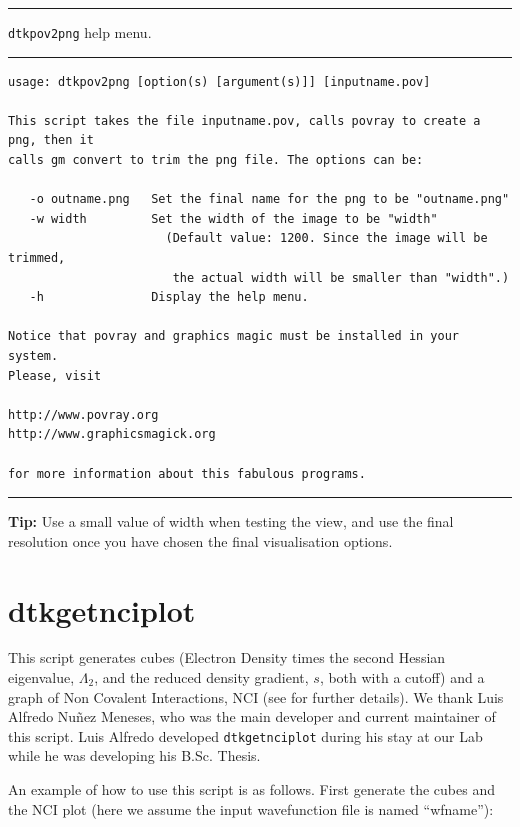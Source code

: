 \rule{\textwidth}{1pt}
{\center\texttt{dtkpov2png} help menu.\\}
\rule{\textwidth}{1pt}
\begin{footnotesize}
\begin{verbatim}
usage: dtkpov2png [option(s) [argument(s)]] [inputname.pov]

This script takes the file inputname.pov, calls povray to create a png, then it
calls gm convert to trim the png file. The options can be:

   -o outname.png   Set the final name for the png to be "outname.png"
   -w width         Set the width of the image to be "width"
                      (Default value: 1200. Since the image will be trimmed, 
                       the actual width will be smaller than "width".)
   -h               Display the help menu.

Notice that povray and graphics magic must be installed in your system.
Please, visit

http://www.povray.org
http://www.graphicsmagick.org

for more information about this fabulous programs.
\end{verbatim}
\end{footnotesize}
\rule{\textwidth}{1pt}

\textbf{Tip:} Use a small value of width when testing the view, and use the final resolution once you have chosen the final visualisation options.

\section{dtkgetnciplot}\label{sec:dtkgetnciplotdesc}
This script generates cubes (Electron Density times the second Hessian eigenvalue, $\Lambda_2$,
and the reduced density gradient, $s$, both with
a cutoff) and a graph of Non Covalent Interactions, NCI (see \cite{bib:contreras2011}
for further details). We thank Luis Alfredo Nu\~nez Meneses, who was the main developer and current
maintainer of this script. Luis Alfredo developed \texttt{dtkgetnciplot} during his stay at our Lab
while he was developing his B.Sc. Thesis.

An example of how to use this script is as follows. First generate the cubes and the NCI plot
(here we assume the input wavefunction file is named ``wfname''):

